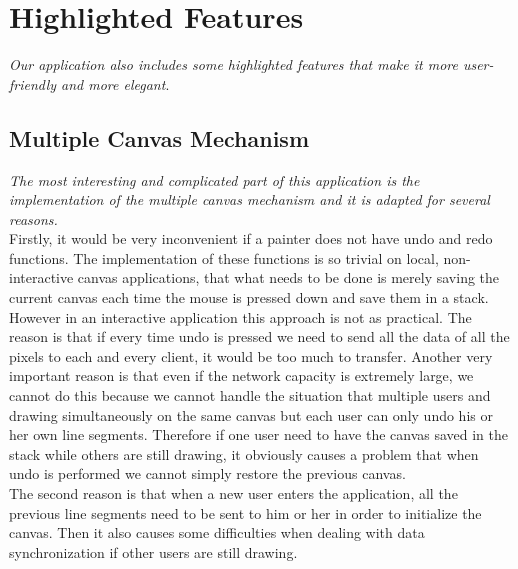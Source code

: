 \documentclass[a4paper,11pt,3p]{article}
\begin{document}
\section{Highlighted Features}
\emph{Our application also includes some highlighted features that make it more user-friendly and 
more elegant}.\\

\subsection{Multiple Canvas Mechanism}
\emph{The most interesting and complicated part of this application is the implementation of the multiple canvas 
mechanism and it is adapted for several reasons.}\\

Firstly, it would be very inconvenient if a painter does not have undo and redo functions. 
The implementation of these functions is so trivial on local, non-interactive canvas applications, 
that what needs to be done is merely saving the current canvas each time the mouse is pressed 
down and save them in a stack. However in an interactive application this approach is not as 
practical. The reason is that if every time undo is pressed we need to send all the data of 
all the pixels to each and every client, it would be too much to transfer. Another very important 
reason is that even if the network capacity is extremely large, we cannot do this because we cannot 
handle the situation that multiple users and drawing simultaneously on the same canvas but each user 
can only undo his or her own line segments. Therefore if one user need to have the canvas saved in the 
stack while others are still drawing, it obviously causes a problem that when undo is performed we cannot 
simply restore the previous canvas.\\

The second reason is that when a new user enters the application, all the previous line segments need to 
be sent to him or her in order to initialize the canvas. Then it also causes some difficulties 
when dealing with data synchronization if other users are still drawing.\\
\end{document}

